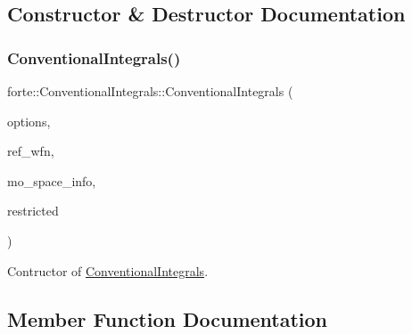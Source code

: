 \subsection{Constructor \& Destructor Documentation}
\mbox{\label{classforte_1_1_conventional_integrals_a4b49dff68c291079528e82420e037248}} 
\subsubsection{\texorpdfstring{Conventional\+Integrals()}{ConventionalIntegrals()}}
{\footnotesize\ttfamily forte\+::\+Conventional\+Integrals\+::\+Conventional\+Integrals (\begin{DoxyParamCaption}\item[{std\+::shared\+\_\+ptr$<$ \mbox{\hyperlink{classforte_1_1_forte_options}{Forte\+Options}} $>$}]{options,  }\item[{std\+::shared\+\_\+ptr$<$ psi\+::\+Wavefunction $>$}]{ref\+\_\+wfn,  }\item[{std\+::shared\+\_\+ptr$<$ \mbox{\hyperlink{classforte_1_1_m_o_space_info}{M\+O\+Space\+Info}} $>$}]{mo\+\_\+space\+\_\+info,  }\item[{\mbox{\hyperlink{namespaceforte_a7defa2660dd3eb07aa81176b90781be7}{Integral\+Spin\+Restriction}}}]{restricted }\end{DoxyParamCaption})}



Contructor of \mbox{\hyperlink{classforte_1_1_conventional_integrals}{Conventional\+Integrals}}. 



\subsection{Member Function Documentation}
\mbox{\label{classforte_1_1_conventional_integrals_a4df626960614077f1df435efba44bd0a}} 
